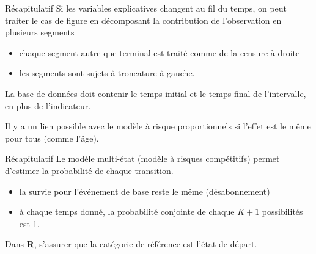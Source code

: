 \documentclass[
  ignorenonframetext,
]{beamer}
\providecommand{\tightlist}{%
  \setlength{\itemsep}{0pt}\setlength{\parskip}{0pt}}\usepackage{longtable,booktabs,array}
\begin{document}
\begin{frame}{Récapitulatif}
\protect\hypertarget{ruxe9capitulatif-1}{}
Si les variables explicatives changent au fil du temps, on peut traiter
le cas de figure en décomposant la contribution de l'observation en
plusieurs segments

\begin{itemize}
\tightlist
\item
  chaque segment autre que terminal est traité comme de la censure à
  droite
\item
  les segments sont sujets à troncature à gauche.
\end{itemize}

La base de données doit contenir le temps initial et le temps final de
l'intervalle, en plus de l'indicateur.

Il y a un lien possible avec le modèle à risque proportionnels si
l'effet est le même pour tous (comme l'âge).
\end{frame}

\begin{frame}{Récapitulatif}
\protect\hypertarget{ruxe9capitulatif-2}{}
Le modèle multi-état (modèle à risques compétitifs) permet d'estimer la
probabilité de chaque transition.

\begin{itemize}
\tightlist
\item
  la survie pour l'événement de base reste le même (désabonnement)
\item
  à chaque temps donné, la probabilité conjointe de chaque \(K+1\)
  possibilités est 1.
\end{itemize}

Dans \textbf{R}, s'assurer que la catégorie de référence est l'état de
départ.
\end{frame}
\end{document}
